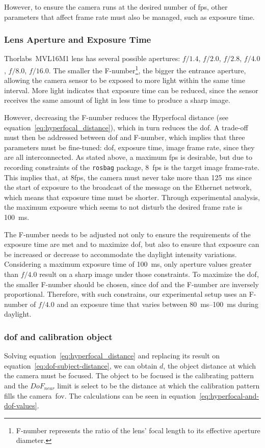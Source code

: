 However, to ensure the camera runs at the desired number of \ac{fps}, other parameters that affect frame rate must also be managed, such as exposure time.


\subsubsection{Lens Aperture and Exposure Time}
Thorlabs\cp~MVL16M1 lens has several possible apertures: $f/1.4$, $f/2.0$, $f/2.8$, $f/4.0$, $f/8.0$, $f/16.0$. The smaller the F-number\footnote{F-number represents the ratio of the lens' focal length to its effective aperture diameter.}, the bigger the entrance aperture, allowing the camera sensor to be exposed to more light within the same time interval. More light indicates that exposure time can be reduced, since the sensor receives the same amount of light in less time  to produce a sharp image.

However, decreasing the F-number reduces the Hyperfocal distance (see equation~\eqref{eq:hyperfocal_distance}), which in turn reduces the \acf{dof}. A trade-off must then be addressed between \ac{dof} and F-number, which implies that three parameters must be fine-tuned: \ac{dof}, exposure time, image frame rate, since they are all interconnected. As stated above, a maximum \ac{fps} is desirable, but due to recording constraints of the \texttt{rosbag} package, $8$~\ac{fps} is the target image frame-rate. This implies that, at $8$\ac{fps}, the camera must never take more than \SI{125}{\milli\second} since the start of exposure to the broadcast of the message on the Ethernet network, which means that exposure time must be shorter. Through experimental analysis, the maximum exposure which seems to not disturb the desired frame rate is \SI{100}{\milli\second}. 

The F-number needs to be adjusted not only to ensure the requirements of the exposure time are met and to maximize \acl{dof}, but also to ensure that exposure can be increased or decrease to accommodate the daylight intensity variations. Considering a maximum exposure time of \SI{100}{\milli\second}, only aperture values greater than $f/4.0$ result on a sharp image under those constraints. To maximize the \ac{dof}, the smaller F-number should be chosen, since \ac{dof} and the F-number are inversely proportional. Therefore, with such constrains, our experimental setup uses an F-number of $f/4.0$ and an exposure time that varies between \SIrange{80}{100}{\milli\second} during daylight.

\subsubsection{\acl{dof} and calibration object}
\label{subsec:calibration:dof-and-calibration-object}
Solving equation~\ref{eq:hyperfocal_distance} and replacing its result on equation~\ref{eq:dof-subject-distance}, we can obtain $d$, the object distance at which the camera must be focused. The object to be focused is the calibrating pattern and the $DoF_{near}$ limit is select to be the distance at which the calibration pattern fills the camera~\ac{fov}. The calculations can be seen in equation~\ref{eq:hyperfocal-and-dof-values}.

